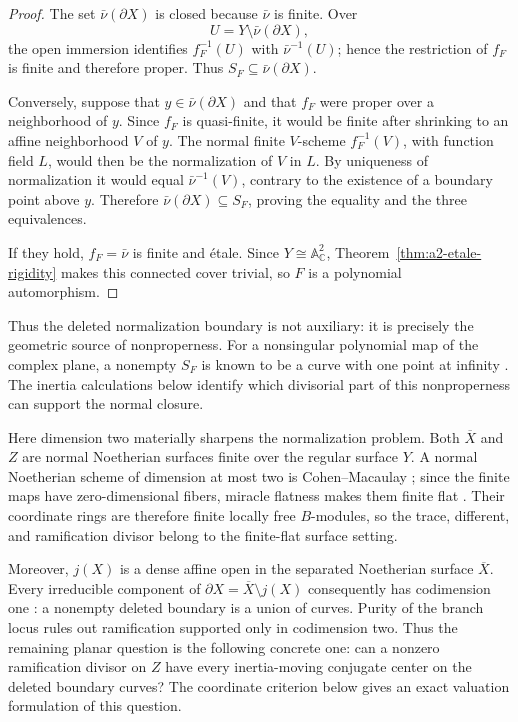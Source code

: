 \documentclass[11pt]{article}
\theoremstyle{remark}
\theoremstyle{definition}
\newcommand{\A}{\mathbb A}
\newcommand{\C}{\mathbb C}
\begin{document}
\begin{proof}
The set \(\bar\nu(\partial X)\) is closed because \(\bar\nu\) is finite.
Over
\[
  U=Y\setminus\bar\nu(\partial X),
\]
the open immersion identifies \(f_F^{-1}(U)\) with
\(\bar\nu^{-1}(U)\); hence the restriction of \(f_F\) is finite and
therefore proper.  Thus \(S_F\subseteq\bar\nu(\partial X)\).

Conversely, suppose that \(y\in\bar\nu(\partial X)\) and that \(f_F\)
were proper over a neighborhood of \(y\).  Since \(f_F\) is quasi-finite,
it would be finite after shrinking to an affine neighborhood \(V\) of
\(y\).  The normal finite \(V\)-scheme \(f_F^{-1}(V)\), with function
field \(L\), would then be the normalization of \(V\) in \(L\).  By
uniqueness of normalization it would equal \(\bar\nu^{-1}(V)\), contrary
to the existence of a boundary point above \(y\).  Therefore
\(\bar\nu(\partial X)\subseteq S_F\), proving the equality and the three
equivalences.

If they hold, \(f_F=\bar\nu\) is finite and \'etale.  Since
\(Y\cong\A^2_{\C}\), Theorem~\ref{thm:a2-etale-rigidity} makes this
connected cover trivial, so \(F\) is a polynomial automorphism.
\end{proof}

Thus the deleted normalization boundary is not auxiliary: it is precisely
the geometric source of nonproperness.  For a nonsingular polynomial map of
the complex plane, a nonempty \(S_F\) is known to be a curve with one point
at infinity \cite{ChauNonproperValueSet}.  The inertia calculations below
identify which divisorial part of this nonproperness can support the normal
closure.

Here dimension two materially sharpens the normalization problem.  Both
\(\overline X\) and \(Z\) are normal Noetherian surfaces finite over the
regular surface \(Y\).  A normal Noetherian scheme of dimension at most two
is Cohen--Macaulay \cite{StacksNormalSurfaceCM}; since the finite maps have
zero-dimensional fibers, miracle flatness makes them finite flat
\cite{StacksMiracleFlatness}.  Their coordinate rings are therefore finite
locally free \(B\)-modules, so the trace, different, and ramification divisor
belong to the finite-flat surface setting.

Moreover, \(j(X)\) is a dense affine open in the separated Noetherian surface
\(\overline X\).  Every irreducible component of
\(\partial X=\overline X\setminus j(X)\) consequently has codimension one
\cite{StacksAffineComplement}: a nonempty deleted boundary is a union of
curves.  Purity of the branch locus rules out ramification supported only in
codimension two.  Thus the remaining planar question is the following
concrete one: can a nonzero ramification divisor on \(Z\) have every
inertia-moving conjugate center on the deleted boundary curves?  The
coordinate criterion below gives an exact valuation formulation of this
question.
\end{document}
